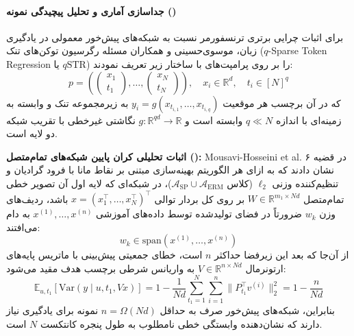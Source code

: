 \paragraph*{جداسازی آماری و تحلیل پیچیدگی نمونه ()}
برای اثبات چرایی برتری ترنسفورمر نسبت به شبکه‌های پیش‌خور معمولی در یادگیری زبان، موسوی‌حسینی و همکاران \cite{mousavihosseini2025transformers} مسئله رگرسیون توکن‌های تنک ($q$-Sparse Token Regression یا $q\text{STR}$) را بر روی پرامپت‌های با ساختار زیر تعریف نمودند:
\begin{equation}
    p = \left( \begin{pmatrix} x_1 \\ t_1 \end{pmatrix}, \dots, \begin{pmatrix} x_N \\ t_N \end{pmatrix} \right), \quad x_i \in \mathbb{R}^d, \quad t_i \in [N]^q
\end{equation}
که در آن برچسب هر موقعیت $y_i = g(x_{t_{i,1}}, \dots, x_{t_{i,q}})$ به زیرمجموعه تنک و وابسته به زمینه‌ای با اندازه $q \ll N$ وابسته است و $g: \mathbb{R}^{qd} \to \mathbb{R}$ نگاشتی غیرخطی با تقریب شبکه دو لایه است.

\textbf{اثبات تحلیلی کران پایین شبکه‌های تمام‌متصل ():}
Mousavi-Hosseini et al. \cite{mousavihosseini2025transformers} در قضیه ۶ نشان دادند که به ازای هر الگوریتم بهینه‌سازی مبتنی بر نقاط مانا با فرود گرادیان و تنظیم‌کننده وزنی $\ell_2$ (کلاس $\mathcal{A}_{\text{SP}} \cup \mathcal{A}_{\text{ERM}}$)، در شبکه‌ای که لایه اول آن تصویر خطی تمام‌متصل $W \in \mathbb{R}^{m_1 \times Nd}$ بر روی کل بردار توالی $x = (x_1^\top, \dots, x_N^\top)^\top$ باشد، ردیف‌های وزن $w_k$ ضرورتاً در فضای تولیدشده توسط داده‌های آموزشی $x^{(1)}, \dots, x^{(n)}$ به دام می‌افتند:
\begin{equation}
    w_k \in \text{span}\left(x^{(1)}, \dots, x^{(n)}\right)
\end{equation}
از آن‌جا که بعد این زیرفضا حداکثر $n$ است، خطای جمعیتی پیش‌بینی با ماتریس پایه‌های ارتونرمال $V \in \mathbb{R}^{n \times Nd}$ به واریانس شرطی برچسب هدف مقید می‌شود:
\begin{equation}
    \mathbb{E}_{u, t_1} \left[ \text{Var}\left(y \mid u, t_1, Vx\right) \right] = 1 - \frac{1}{Nd} \sum_{t_1=1}^N \sum_{i=1}^n \|P_{t_1}^\top v^{(i)}\|_2^2 = 1 - \frac{n}{Nd}
\end{equation}
بنابراین، شبکه‌های پیش‌خور صرف به حداقل $n = \Omega(Nd)$ نمونه برای یادگیری نیاز دارند که نشان‌دهنده وابستگی خطی نامطلوب به طول پنجره کانتکست $N$ است. 

